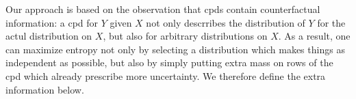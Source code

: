 \documentclass{article}
\theoremstyle{plain}
\theoremstyle{definition}
\theoremstyle{remark}
\newcommand{\commentout}[1]{\ignorespaces}
\numberwithin{equation}{section}
\begin{document}
% 
        
        Our approach is based on the observation that cpds contain
counterfactual information:  
	a cpd for $Y$ given $X$ not only descrribes the distribution of $Y$
        for the actul distribution on $X$, but also for
        arbitrary distributions on $X$.
        As a result, one can maximize
        entropy not only by selecting a distribution which makes
        things as independent as possible, but also by simply putting
        extra mass on rows of the cpd which already prescribe more
        uncertainty. We therefore define the extra information below. 
	
\end{document}
